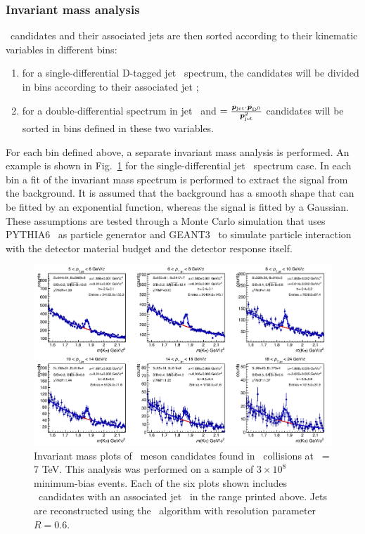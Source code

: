 \documentclass[12pt, a4paper, twoside, titlepage]{article}
\begin{document}
\subsubsection{Invariant mass analysis}
\Dzero\ candidates and their associated jets are then sorted according to their kinematic variables in different bins:
\begin{enumerate}
\item for a single-differential D-tagged jet \pt\ spectrum, the candidates will be divided in bins according to their associated jet \pt;
\item for a double-differential spectrum in jet \pt\ and \zpar$=\frac{\bm{p}_{\rm jet}\cdot{\bm{p}}_{\rm D^0}}{\bm{p}_{\rm jet}^2}$ candidates will
be sorted in bins defined in these two variables.
\end{enumerate}
For each bin defined above, a separate invariant mass analysis is performed. An example is shown in Fig.~\ref{fig:InvMassSingleDiff} for the single-differential
jet \pt\ spectrum case. 
In each bin a fit of the invariant mass spectrum is performed to extract the signal from the background. It is assumed that the background has
a smooth shape that can be fitted by an exponential function, whereas the signal is fitted by a Gaussian. These assumptions are tested
through a Monte Carlo simulation that uses PYTHIA6~\cite{Sjostrand:2006} as particle generator and GEANT3~\cite{GEANT3-url} to simulate particle interaction
with the detector material budget and the detector response itself.

\begin{figure}[tb]
\begin{center}
\includegraphics[width=1.0\textwidth]{img/InvMassSingleDiff}
 \caption{Invariant mass plots of \Dzero\ meson candidates found in \pp\ collisions at \s\ = 7 TeV. This analysis
 was performed on a sample of $3\times 10^8$ minimum-bias events. Each of the six plots shown includes \Dzero\ candidates
 with an associated jet \pt\ in the range printed above. Jets are reconstructed using the \antikt\ algorithm with resolution parameter $R=0.6$. } 
 \label{fig:InvMassSingleDiff}
\end{center}
\end{figure}
\end{document}
